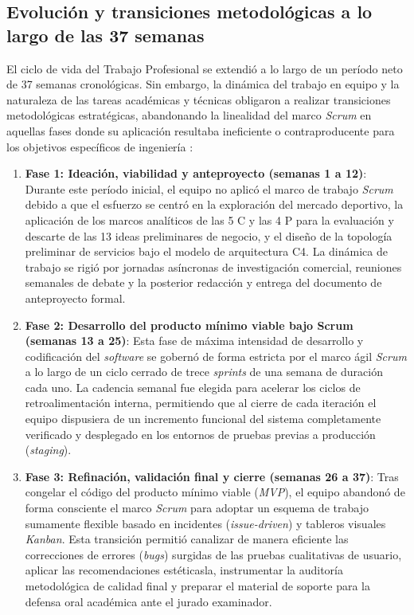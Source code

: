 \documentclass[conference, a4paper]{IEEEtran}
\begin{document}
\subsection{Evoluci\'on y transiciones metodol\'ogicas a lo largo de las 37 semanas}
El ciclo de vida del Trabajo Profesional se extendi\'o a lo largo de un per\'iodo neto de 37 semanas cronol\'ogicas. Sin embargo, la din\'amica del trabajo en equipo y la naturaleza de las tareas acad\'emicas y t\'ecnicas obligaron a realizar transiciones metodol\'ogicas estrat\'egicas, abandonando la linealidad del marco \textit{Scrum} en aquellas fases donde su aplicaci\'on resultaba ineficiente o contraproducente para los objetivos espec\'ificos de ingenier\'ia :

\begin{enumerate}
    \item \textbf{Fase 1: Ideaci\'on, viabilidad y anteproyecto (semanas 1 a 12)}: Durante este per\'iodo inicial, el equipo no aplic\'o el marco de trabajo \textit{Scrum} debido a que el esfuerzo se centr\'o en la exploraci\'on del mercado deportivo, la aplicaci\'on de los marcos anal\'iticos de las 5 C y las 4 P para la evaluaci\'on y descarte de las 13 ideas preliminares de negocio, y el dise\~no de la topolog\'ia preliminar de servicios bajo el modelo de arquitectura C4. La din\'amica de trabajo se rigi\'o por jornadas as\'incronas de investigaci\'on comercial, reuniones semanales de debate y la posterior redacci\'on y entrega del documento de anteproyecto formal.
    \item \textbf{Fase 2: Desarrollo del producto m\'inimo viable bajo Scrum (semanas 13 a 25)}: Esta fase de m\'axima intensidad de desarrollo y codificaci\'on del \textit{software} se gobern\'o de forma estricta por el marco \'agil \textit{Scrum} a lo largo de un ciclo cerrado de trece \textit{sprints} de una semana de duraci\'on cada uno. La cadencia semanal fue elegida para acelerar los ciclos de retroalimentaci\'on interna, permitiendo que al cierre de cada iteraci\'on el equipo dispusiera de un incremento funcional del sistema completamente verificado y desplegado en los entornos de pruebas previas a producci\'on (\textit{staging}).
    \item \textbf{Fase 3: Refinaci\'on, validaci\'on final y cierre (semanas 26 a 37)}: Tras congelar el c\'odigo del producto m\'inimo viable (\textit{MVP}), el equipo abandon\'o de forma consciente el marco \textit{Scrum} para adoptar un esquema de trabajo sumamente flexible basado en incidentes (\textit{issue-driven}) y tableros visuales \textit{Kanban}. Esta transici\'on permiti\'o canalizar de manera eficiente las correcciones de errores (\textit{bugs}) surgidas de las pruebas cualitativas de usuario, aplicar las recomendaciones est\'eticasla, instrumentar la auditor\'ia metodol\'ogica de calidad final y preparar el material de soporte para la defensa oral acad\'emica ante el jurado examinador.
\end{enumerate}
\end{document}
